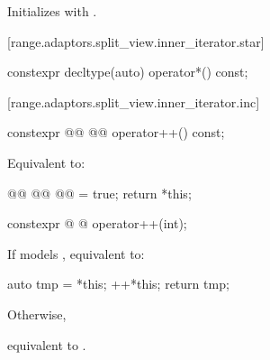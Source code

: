 {\begin{itemdescr}
\pnum
\effects Initializes  with .
\end{itemdescr}

[range.adaptors.split_view.inner_iterator.star]{}

%
\begin{itemdecl}
constexpr decltype(auto) operator*() const;
\end{itemdecl}

\begin{itemdescr}
\pnum
{}

\end{itemdescr}

[range.adaptors.split_view.inner_iterator.inc]{}

%
\begin{itemdecl}
constexpr @@ @@ operator++() const;
\end{itemdecl}

\begin{itemdescr}
\pnum
\effects Equivalent to:
\begin{codeblock}
@@
@@
@\oldtxt{_}@ = true;
return *this;
\end{codeblock}
\end{itemdescr}

%
\begin{itemdecl}
constexpr @ @ operator++(int);
\end{itemdecl}

\begin{itemdescr}
\pnum
\effects
{\color{newclr}
If  models , equivalent to:
\begin{codeblock}
auto tmp = *this;
++*this;
return tmp;
\end{codeblock}
Otherwise,
} %
equivalent to .
\end{itemdescr}

}
